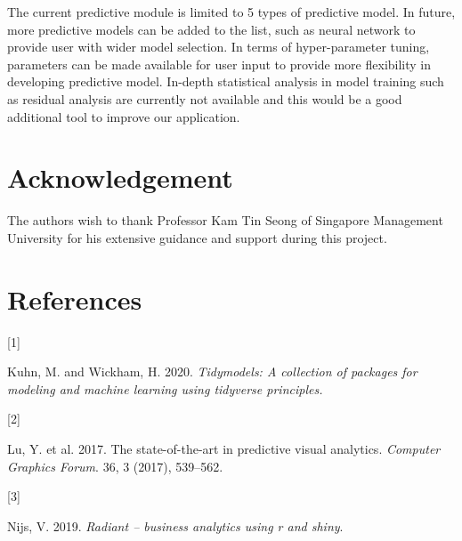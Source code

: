 \documentclass{acm_proc_article-sp}
\newlength{\csllabelwidth}
\newlength{\cslhangindent}
\newenvironment{CSLReferences}[3] %
 {%
  \setlength{\parindent}{0pt}
  \ifodd #1 \everypar{\setlength{\hangindent}{\cslhangindent}}\ignorespaces\fi
  \ifnum #2 > 0
  \setlength{\parskip}{#2\baselineskip}
  \fi
 }%
 {}
\newcommand{\CSLLeftMargin}[1]{\parbox[t]{\csllabelwidth}{#1}}
\newcommand{\CSLRightInline}[1]{\parbox[t]{\linewidth - \csllabelwidth}{#1}}
\begin{document}
The current predictive module is limited to 5 types of predictive model.
In future, more predictive models can be added to the list, such as
neural network to provide user with wider model selection. In terms of
hyper-parameter tuning, parameters can be made available for user input
to provide more flexibility in developing predictive model. In-depth
statistical analysis in model training such as residual analysis are
currently not available and this would be a good additional tool to
improve our application.

\hypertarget{acknowledgement}{%
\section{Acknowledgement}\label{acknowledgement}}

The authors wish to thank Professor Kam Tin Seong of Singapore
Management University for his extensive guidance and support during this
project.

\hypertarget{references}{%
\section*{References}\label{references}}

\hypertarget{refs}{}
\begin{CSLReferences}{0}{0}
\leavevmode{}%
\CSLLeftMargin{{[}1{]} }
\CSLRightInline{Kuhn, M. and Wickham, H. 2020. \emph{Tidymodels: A
collection of packages for modeling and machine learning using tidyverse
principles.}}

\leavevmode{}%
\CSLLeftMargin{{[}2{]} }
\CSLRightInline{Lu, Y. et al. 2017. The state-of-the-art in predictive
visual analytics. \emph{Computer Graphics Forum}. 36, 3 (2017),
539--562.}

\leavevmode{}%
\CSLLeftMargin{{[}3{]} }
\CSLRightInline{Nijs, V. 2019. \emph{Radiant -- business analytics using
r and shiny}.}

\end{CSLReferences}
\setlength{\parindent}{0in}
\end{document}
